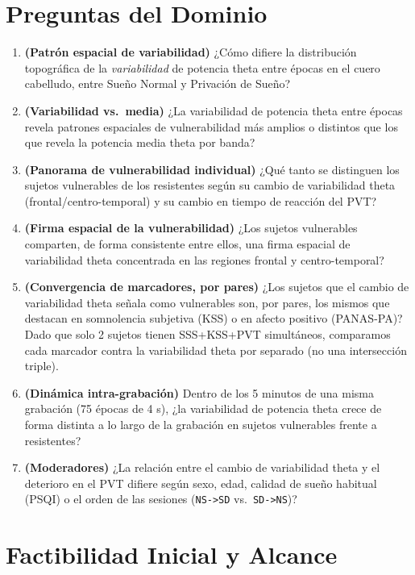 \documentclass[10pt]{article}
\begin{document}
\section{Preguntas del Dominio}
\begin{enumerate}[leftmargin=2.2em, label=\textbf{Q\arabic*.}, ref=Q\arabic*]
    \item \textbf{(Patrón espacial de variabilidad)} ¿Cómo difiere la distribución topográfica de la \emph{variabilidad} de potencia theta entre épocas en el cuero cabelludo, entre Sueño Normal y Privación de Sueño?
    \item \textbf{(Variabilidad vs.\ media)} ¿La variabilidad de potencia theta entre épocas revela patrones espaciales de vulnerabilidad más amplios o distintos que los que revela la potencia media theta por banda?
    \item \textbf{(Panorama de vulnerabilidad individual)} ¿Qué tanto se distinguen los sujetos vulnerables de los resistentes según su cambio de variabilidad theta (frontal/centro-temporal) y su cambio en tiempo de reacción del PVT?
    \item \textbf{(Firma espacial de la vulnerabilidad)} ¿Los sujetos vulnerables comparten, de forma consistente entre ellos, una firma espacial de variabilidad theta concentrada en las regiones frontal y centro-temporal?
    \item \textbf{(Convergencia de marcadores, por pares)} ¿Los sujetos que el cambio de variabilidad theta señala como vulnerables son, por pares, los mismos que destacan en somnolencia subjetiva (KSS) o en afecto positivo (PANAS-PA)? Dado que solo 2 sujetos tienen SSS+KSS+PVT simultáneos, comparamos cada marcador contra la variabilidad theta por separado (no una intersección triple).
    \item \textbf{(Dinámica intra-grabación)} Dentro de los 5 minutos de una misma grabación (75 épocas de 4 s), ¿la variabilidad de potencia theta crece de forma distinta a lo largo de la grabación en sujetos vulnerables frente a resistentes?
    \item \textbf{(Moderadores)} ¿La relación entre el cambio de variabilidad theta y el deterioro en el PVT difiere según sexo, edad, calidad de sueño habitual (PSQI) o el orden de las sesiones (\texttt{NS->SD} vs.\ \texttt{SD->NS})?
\end{enumerate}

\section{Factibilidad Inicial y Alcance}
\end{document}
